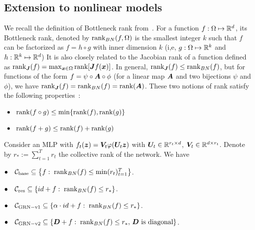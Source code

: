 \subsection{Extension to nonlinear models}
We recall the definition of Bottleneck rank from~\cite{jacot2022implicit}. For a function $f:\Omega \mapsto \mathbb{R}^d$, its Bottleneck rank, denoted by $\operatorname{rank}_{BN}(f,\Omega)$ is the  smallest integer $k$ 
such that $f$ can be factorized as $f = h\circ g$
with inner dimension $k$ (i,e, $g:\Omega\mapsto \mathbb{R}^k$ and $h:\mathbb{R}^k\mapsto \mathbb{R}^d$) It is also closely related to the Jacobian rank of a function defined as $\operatorname{rank}_{\bm{J}} (f) = \max_{\bm{x}\in\Omega} \operatorname{rank} [\bm{J} f(\bm{x})]$.  In general, $\operatorname{rank}_{\bm{J}}(f) \le \operatorname{rank}_{BN}(f)$, but for functions of the form $f =
\psi \circ {\bm{A}} \circ \phi$ (for a linear map ${\bm{A}}$ and two bijections $\psi$ and $\phi$), we have $\operatorname{rank}_{\bm{J}}(f) = \operatorname{rank}_{BN}(f) =
\operatorname{rank}({\bm{A}})$. These two notions of rank satisfy the following properties~\cite{jacot2022implicit}:
\begin{itemize}
    \item $\operatorname{rank}(f\circ g)\le \min\{\operatorname{rank}(f), \operatorname{rank}(g)\}$
    \item $\operatorname{rank}(f+g)\le \operatorname{rank}(f)+\operatorname{rank}(g)$
\end{itemize}
\begin{proposition}\label{pro:nonlinear}
Consider an MLP with $f_t({\bm{z}}) = {\bm{V}}_t \varphi({\bm{U}}_t {\bm{z}})$ with ${\bm{U}}_t\in\mathbb{R}^{r_t\times d}$, ${\bm{V}}_t\in\mathbb{R}^{d\times r_t}$. Denote by $r_* := \sum_{t=1}^T r_t$ the collective rank of the network. We have

    $\bullet \quad \mathcal{C}_{{\rm base}}\subseteq  \left\{ f:\; \operatorname{rank}_{BN}(f)\le \min(r_t)_{t=1}^T\right\}$. 
    
    $\bullet \quad \mathcal{C}_{{\rm res}}\subseteq  \left\{ id+ f:\; \operatorname{rank}_{BN}(f)\le r_*\right\}$.
    
    $\bullet \quad \mathcal{C}_{{\rm GRN-v1{}}}\subseteq  \left\{\alpha \cdot  id+ f:\; \operatorname{rank}_{BN}(f)\le r_* \right\}$.
    
    $\bullet \quad \mathcal{C}_{{\rm GRN-v2{}}}\subseteq  \left\{{\bm{D}}+ f:\; \operatorname{rank}_{BN}(f)\le r_*, \, {\bm{D}} \text{ is diagonal}\right\}$.

\end{proposition}